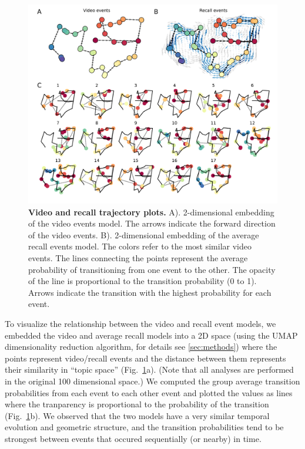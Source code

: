 \documentclass{article}
\begin{document}
{\begin{figure}[t!]
\centering
\includegraphics[width=1\textwidth]{figs/4_trajectory.pdf}
\caption{\small \textbf{Video and recall trajectory plots.} A). 2-dimensional embedding of the video events model. The arrows indicate the forward direction of the video events. B). 2-dimensional embedding of the average recall events model.  The colors refer to the most similar video events. The lines connecting the points represent the average probability of transitioning from one event to the other. The opacity of the line is proportional to the transition probability (0 to 1). Arrows indicate the transition with the highest probability for each event.}
\label{fig:trajectory}
\end{figure}

To visualize the relationship between the video and recall event models, we embedded the video and average recall models into a 2D space (using the UMAP dimensionality reduction algorithm, for details see \ref{sec:methods}) where the points represent video/recall events and the distance between them represents their similarity in ``topic space'' (Fig.~\ref{fig:trajectory}a). (Note that all analyses are performed in the original 100 dimensional space.) We computed the group average transition probabilities from each event to each other event and plotted the values as lines where the tranparency is proportional to the probability of the transition (Fig.~\ref{fig:trajectory}b).  We observed that the two models have a very similar temporal evolution and geometric structure, and the transition probabilities tend to be strongest between events that occured sequentially (or nearby) in time.

}
\end{document}
